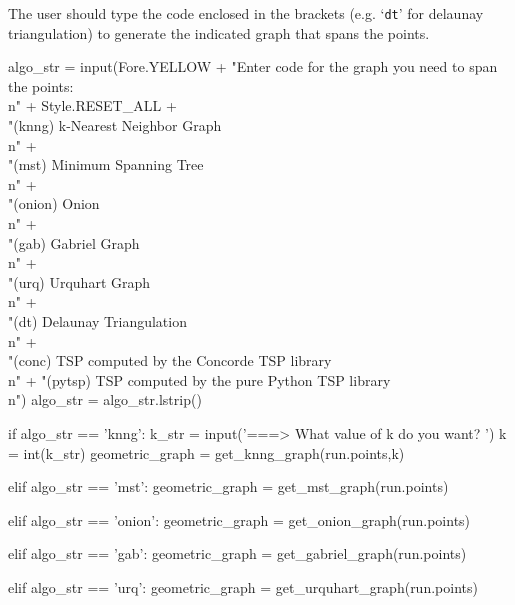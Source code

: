 The user should type the code enclosed in the brackets (e.g. `\verb|dt|' for delaunay triangulation) to generate the 
indicated graph that spans the points. 

\nwenddocs{}\endmoddef\nwstartdeflinemarkup{}\nwenddeflinemarkup
algo_str = input(Fore.YELLOW + "Enter code for the graph you need to span the points:\\n" + Style.RESET_ALL  +\\
                     "(knng)   k-Nearest Neighbor Graph        \\n"            +\\
                     "(mst)    Minimum Spanning Tree           \\n"            +\\
                     "(onion)  Onion                           \\n"            +\\
                     "(gab)    Gabriel Graph                 \\n"            +\\
                     "(urq)    Urquhart Graph                    \\n"            +\\
                     "(dt)     Delaunay Triangulation         \\n"             +\\
                     "(conc)   TSP computed by the Concorde TSP library \\n" +
                     "(pytsp)  TSP computed by the pure Python TSP library \\n")
algo_str = algo_str.lstrip()

if algo_str == 'knng':
      k_str = input('===> What value of k do you want? ')
      k     = int(k_str)
      geometric_graph = get_knng_graph(run.points,k)

elif algo_str == 'mst':
     geometric_graph = get_mst_graph(run.points)

elif algo_str == 'onion':
     geometric_graph = get_onion_graph(run.points)

elif algo_str == 'gab':
     geometric_graph = get_gabriel_graph(run.points)

elif algo_str == 'urq':
     geometric_graph = get_urquhart_graph(run.points)

